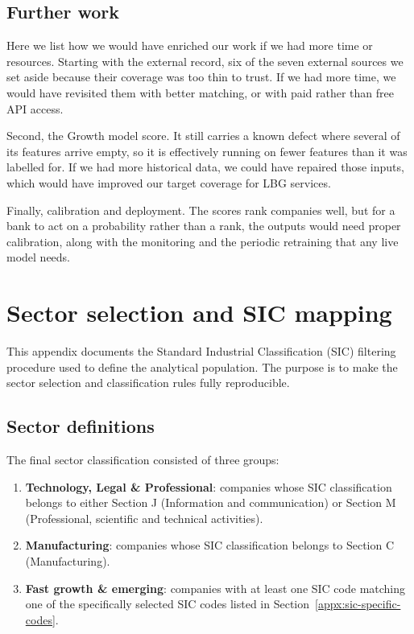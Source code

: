 \documentclass[    author={Samuel Menon Demelo; Sneha Saphala Ram Prasad; 
Viktor Ander Lindholm; Vishal Khatri},
               supervisor={Prof. Fernando Moreno-Pino},
                   degree={MSc},
                    title={Lloyds Commercial Banking Intelligence},
                 subtitle={Ranking SME Lending, Risk and Growth Prospects for Lloyds Banking Group},
                     type={},
                     year={2026}]{dissertation}
\newcommand{\note}[1]{}
\begin{document}
\section{Further work}
Here we list how we would have enriched our work if we had more time or resources. Starting with the external record, six of the seven external sources we set aside because their coverage was too thin to trust. If we had more time, we would have revisited them with better matching, or with paid rather than free API access. 

Second, the Growth model score. It still carries a known defect where several of its features arrive empty, so it is effectively running on fewer features than it was labelled for. If we had more historical data, we could have repaired those inputs, which would have improved our target coverage for LBG services.

Finally, calibration and deployment. The scores rank companies well, but for a bank to act on a probability rather than a rank, the outputs would need proper calibration, along with the monitoring and the periodic retraining that any live model needs.
\backmatter



\appendix

\chapter{Sector selection and SIC mapping}
\label{appx:sic}
\note{The 325 SIC codes mapped onto the three target sectors, the size tiering
from account category with each regulatory definition, and the resulting
segment-by-sector counts.}

This appendix documents the Standard Industrial Classification (SIC)
filtering procedure used to define the analytical population. The purpose is
to make the sector selection and classification rules fully reproducible.

\section{Sector definitions}

The final sector classification consisted of three groups:

\begin{enumerate}
    \item \textbf{Technology, Legal \& Professional}: companies whose SIC
    classification belongs to either Section J (Information and communication)
    or Section M (Professional, scientific and technical activities).

    \item \textbf{Manufacturing}: companies whose SIC classification belongs
    to Section C (Manufacturing).

    \item \textbf{Fast growth \& emerging}: companies with at least one SIC
    code matching one of the specifically selected SIC codes listed in
    Section~\ref{appx:sic-specific-codes}.
\end{enumerate}
\end{document}
